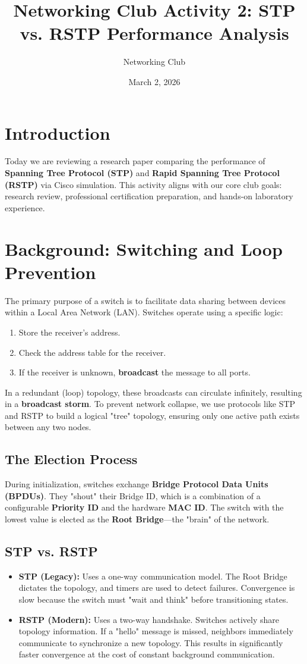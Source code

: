 \documentclass[11pt]{article}
\title{Networking Club Activity 2: STP vs. RSTP Performance Analysis}
\author{Networking Club}
\date{March 2, 2026}
\begin{document}
\maketitle

\section{Introduction}
Today we are reviewing a research paper comparing the performance of \textbf{Spanning Tree Protocol (STP)} and \textbf{Rapid Spanning Tree Protocol (RSTP)} via Cisco simulation. This activity aligns with our core club goals: research review, professional certification preparation, and hands-on laboratory experience.

\section{Background: Switching and Loop Prevention}
The primary purpose of a switch is to facilitate data sharing between devices within a Local Area Network (LAN). Switches operate using a specific logic:
\begin{enumerate}
    \item Store the receiver's address.
    \item Check the address table for the receiver.
    \item If the receiver is unknown, \textbf{broadcast} the message to all ports.
\end{enumerate}

In a redundant (loop) topology, these broadcasts can circulate infinitely, resulting in a \textbf{broadcast storm}. To prevent network collapse, we use protocols like STP and RSTP to build a logical "tree" topology, ensuring only one active path exists between any two nodes.

\subsection{The Election Process}
During initialization, switches exchange \textbf{Bridge Protocol Data Units (BPDUs)}. They "shout" their Bridge ID, which is a combination of a configurable \textbf{Priority ID} and the hardware \textbf{MAC ID}. The switch with the lowest value is elected as the \textbf{Root Bridge}—the "brain" of the network.

\subsection{STP vs. RSTP}
\begin{itemize}
    \item \textbf{STP (Legacy):} Uses a one-way communication model. The Root Bridge dictates the topology, and timers are used to detect failures. Convergence is slow because the switch must "wait and think" before transitioning states.
    \item \textbf{RSTP (Modern):} Uses a two-way handshake. Switches actively share topology information. If a "hello" message is missed, neighbors immediately communicate to synchronize a new topology. This results in significantly faster convergence at the cost of constant background communication.
\end{itemize}
\end{document}
